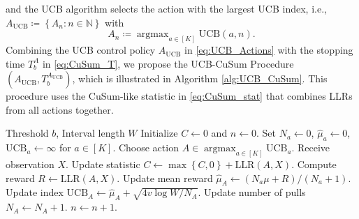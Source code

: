 \documentclass[letterpaper, 10 pt, conference]{ieeeconf}  %
\newcommand{\lp}{\left(}
\newcommand{\rp}{\right)}
\newcommand{\lb}{\left[}
\newcommand{\rb}{\right]}
\newcommand{\lbp}{\left\{}
\newcommand{\rbp}{\right\}}
\newcommand{\mrm}{\mathrm}
\newcommand{\mbb}{\mathbb}
\newcommand{\argmax}{\mathop{\mathrm{argmax}}}
\begin{document}
%
and the UCB algorithm selects the action with the largest UCB index, i.e., $A_{\mrm{UCB}} \coloneqq \lbp A_{n}: n \in \mbb{N} \rbp$ with
%
\begin{equation}\label{eq:UCB_Actions}
    A_{n} \coloneqq \argmax_{a \in \lb K \rb} \mrm{UCB} \lp a, n \rp.
\end{equation}
%
Combining the UCB control policy $A_{\mrm{UCB}}$ in \eqref{eq:UCB_Actions} with the stopping time $T_{b}^{A}$ in \eqref{eq:CuSum_T}, we propose the UCB-CuSum Procedure $\lp A_{\mrm{UCB}}, T_{b}^{A_{\mrm{UCB}}} \rp$, which is illustrated in Algorithm \ref{alg:UCB_CuSum}. This procedure uses the CuSum-like statistic in \eqref{eq:CuSum_stat} that combines LLRs from all actions together. 

\begin{algorithm}[htb]
  \caption{UCB-CuSum Procedure}
  \label{alg:UCB_CuSum}
  \begin{algorithmic}
     Threshold $b$, Interval length $W$
    \STATE Initialize $C \leftarrow 0$ and $n \leftarrow 0$.
    \REPEAT
    \STATE Set $N_{a} \leftarrow 0$, $\hat{\mu}_{a} \leftarrow 0$, $\mrm{UCB}_{a} \leftarrow \infty$ for $a \in \lb K \rb$.
    \ENDIF
    \STATE Choose action $A \in \argmax_{a \in \lb K \rb} \mrm{UCB}_{a}$.
    \STATE Receive observation $X$.
    \STATE Update statistic $C \leftarrow \max\lbp C, 0 \rbp + \mrm{LLR}\lp A, X \rp$.
    \STATE Compute reward $R \leftarrow \mrm{LLR} \lp A, X \rp$.
    \STATE Update mean reward $\hat{\mu}_{A} \leftarrow \lp N_{a} \mu + R \rp/\lp N_{a} + 1 \rp$.
    \STATE Update index $\mrm{UCB}_{A} \leftarrow \hat{\mu}_{A} + \sqrt{4v\log W/N_{A}}$.
    \STATE Update number of pulls $N_{A} \leftarrow N_{A} + 1$.
    \STATE $n \leftarrow n + 1$.
  \end{algorithmic}
\end{algorithm}
\end{document}
